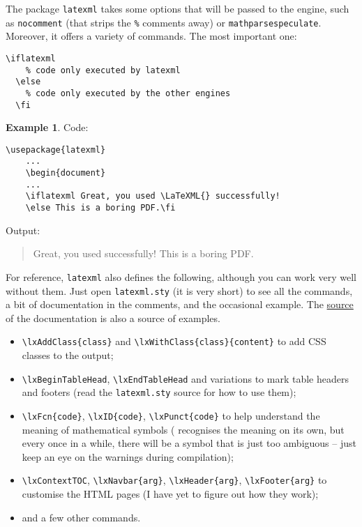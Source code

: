 \documentclass[a4paper]{article}
\def\ltxinline{\lstinline[style=latexml]}
\theoremstyle{definition}
\newtheorem{exa}{Example}[subsection]
\begin{document}
The package \verb|latexml| takes some options that will be passed to the \LaTeXML{} engine, such as \ltxinline|nocomment| (that strips the \ltxinline|%
\begin{lstlisting}[style=latexml]
  \iflatexml
    % code only executed by latexml
  \else
    % code only executed by the other engines
  \fi
\end{lstlisting}

\begin{exa}
  Code:
  \begin{lstlisting}[style=latexml]
    \usepackage{latexml}
    ...
    \begin{document}
    ...
    \iflatexml Great, you used \LaTeXML{} successfully!
    \else This is a boring PDF.\fi
  \end{lstlisting}
  Output:
  \begin{quote}
    \iflatexml Great, you used \LaTeXML{} successfully!
    \else This is a boring PDF.\fi
  \end{quote}
\end{exa}

For reference, \verb|latexml| also defines the following, although you can work very well without them. Just open \verb|latexml.sty| (it is very short) to see all the commands, a bit of documentation in the comments, and the occasional example. The \href{https://github.com/brucemiller/LaTeXML/tree/master/doc/manual}{source} of the \LaTeXML{} documentation is also a source of examples.
\begin{itemize}
  \item \ltxinline|\lxAddClass{class}| and \ltxinline|\lxWithClass{class}{content}| to add CSS classes to the output;
  \item \ltxinline|\lxBeginTableHead|, \ltxinline|\lxEndTableHead| and variations to mark table headers and footers (read the \verb|latexml.sty| source for how to use them);
  \item \ltxinline|\lxFcn{code}|, \ltxinline|\lxID{code}|, \ltxinline|\lxPunct{code}| to help \LaTeXML{} understand the meaning of mathematical symbols (\LaTeXML{} recognises the meaning on its own, but every once in a while, there will be a symbol that is just too ambiguous -- just keep an eye on the warnings during compilation);
  \item \ltxinline|\lxContextTOC|, \ltxinline|\lxNavbar{arg}|, \ltxinline|\lxHeader{arg}|, \ltxinline|\lxFooter{arg}| to customise the HTML pages (I have yet to figure out how they work);
  \item and a few other commands.
\end{itemize}
\end{document}
